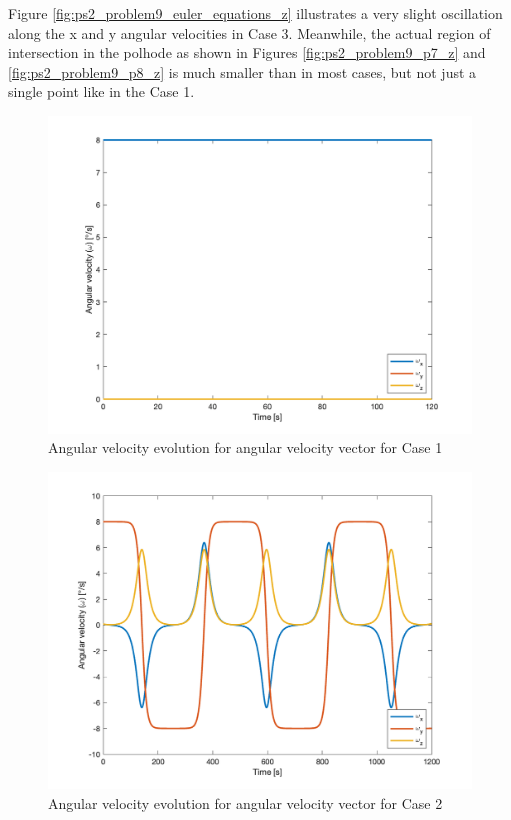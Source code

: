 Figure \ref{fig:ps2_problem9_euler_equations_z} illustrates a very slight oscillation along the x and y angular velocities in Case 3. Meanwhile, the actual region of intersection in the polhode as shown in Figures \ref{fig:ps2_problem9_p7_z} and \ref{fig:ps2_problem9_p8_z} is much smaller than in most cases, but not just a single point like in the Case 1.

\begin{figure}[H]
\centering
\includegraphics[scale=0.6]{Images/ps2_problem9_euler_equations_x.png}
\caption{Angular velocity evolution for angular velocity vector for Case 1}
\label{fig:ps2_problem9_euler_equations_x}
\end{figure}

\begin{figure}[H]
\centering
\includegraphics[scale=0.6]{Images/ps2_problem9_euler_equations_y.png}
\caption{Angular velocity evolution for angular velocity vector for Case 2}
\label{fig:ps2_problem9_euler_equations_y}
\end{figure}

